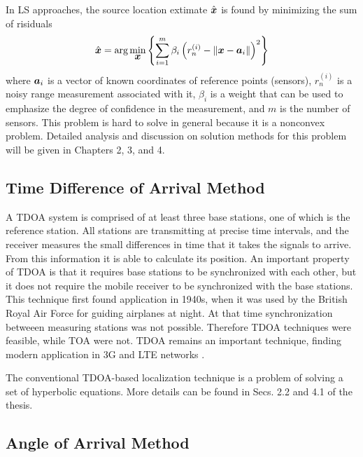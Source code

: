 In LS approaches, the source location extimate $\hat{\mbox{\boldmath$x$}}$ is found by minimizing the sum of risiduals \cite{GeoLoc}
\begin{equation}
\nonumber
\hat{\mbox{\boldmath$x$}} = \mbox{arg}\min_{\mbox{\boldmath$x$}} \left\lbrace \sum_{i=1}^m \beta_i\left(r_n^{(i)} - \|\mbox{\boldmath$x$} - \mbox{\boldmath$a$}_i\|\right)^2 \right\rbrace
\end{equation}
where $\mbox{\boldmath$a$}_i$ is a vector of known coordinates of reference points (sensors),   $r_n^{(i)}$ is a noisy range measurement associated with it, $\beta_i$ is a weight
that can be used to emphasize  the degree of confidence in the measurement, and $m$ is the number of sensors. This problem is hard to solve in general because it is a nonconvex problem. Detailed analysis and discussion on solution methods for this problem will be given in Chapters 2, 3, and 4.


\subsection{Time Difference of Arrival Method}

A TDOA system is comprised of at least three base stations, one of which is the reference station. All stations are transmitting at precise time intervals, and the receiver measures the small differences in time that it takes the signals to arrive. From this information it is able to calculate its position. 
An important property of TDOA is that it requires base stations to be synchronized with each other, but it does not require the mobile receiver to be synchronized with the base stations. This technique first found application
in 1940s, when it was used by the British Royal Air Force for guiding airplanes at night. At that time synchronization betweeen measuring stations was not possible. Therefore TDOA techniques were feasible, while TOA were not. TDOA remains an important technique, finding modern application in 3G and LTE networks \cite{Ascom}.


The conventional TDOA-based localization technique is a problem of solving a set of hyperbolic equations. More details can be found in Secs. 2.2 and 4.1 of the thesis.

\subsection{Angle of Arrival Method}

